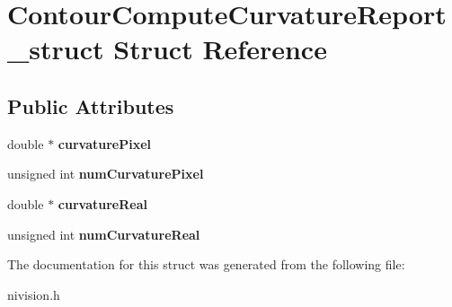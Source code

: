 \hypertarget{structContourComputeCurvatureReport__struct}{
\section{ContourComputeCurvatureReport\_\-struct Struct Reference}
\label{structContourComputeCurvatureReport__struct}
}
\subsection*{Public Attributes}
\begin{DoxyCompactItemize}
\item 
\hypertarget{structContourComputeCurvatureReport__struct_ac70c1aa1281a476f6b033238caa74d00}{
double $\ast$ {\bfseries curvaturePixel}}
\label{structContourComputeCurvatureReport__struct_ac70c1aa1281a476f6b033238caa74d00}

\item 
\hypertarget{structContourComputeCurvatureReport__struct_a2640b50e37d4efdfefe0fca2dcbc7682}{
unsigned int {\bfseries numCurvaturePixel}}
\label{structContourComputeCurvatureReport__struct_a2640b50e37d4efdfefe0fca2dcbc7682}

\item 
\hypertarget{structContourComputeCurvatureReport__struct_abc22de5a612fff66f13edee86e35a5a4}{
double $\ast$ {\bfseries curvatureReal}}
\label{structContourComputeCurvatureReport__struct_abc22de5a612fff66f13edee86e35a5a4}

\item 
\hypertarget{structContourComputeCurvatureReport__struct_a10d6bc8597b16e218ea8460bf7eccff4}{
unsigned int {\bfseries numCurvatureReal}}
\label{structContourComputeCurvatureReport__struct_a10d6bc8597b16e218ea8460bf7eccff4}

\end{DoxyCompactItemize}


The documentation for this struct was generated from the following file:\begin{DoxyCompactItemize}
\item 
nivision.h\end{DoxyCompactItemize}
